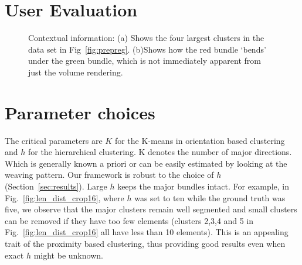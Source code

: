 \section {User Evaluation}
\label {sec:evaluation}
\begin{figure}[h]
\centering
{}
\caption{Contextual information: (a) Shows the four largest clusters in the data set in Fig~\ref{fig:prepreg}.
(b)Shows how the red bundle `bends' under the green bundle, which is not immediately apparent from just the volume rendering.}
\label{fig:context}
\end{figure}

\section{Parameter choices}
\label{sec:param_choices}
The critical parameters are $K$ for the K-means in orientation based clustering and $h$ for the hierarchical clustering. K denotes the number of major directions. Which is generally known a priori or can be easily estimated by looking at the weaving pattern. 
Our framework is robust to the choice of $h$ (Section~\ref{sec:results}). Large $h$ keeps the major bundles intact. For example, in  Fig.~\ref{fig:len_dist_crop16}, where $h$ was set to ten while the ground truth was five, we observe that the major clusters remain well segmented and small clusters can be removed if they have too few elements (clusters 2,3,4 and 5 in Fig.~\ref{fig:len_dist_crop16} all have less than 10 elements). This is an appealing trait of the proximity based clustering, thus providing good results even when exact $h$ might be unknown.

